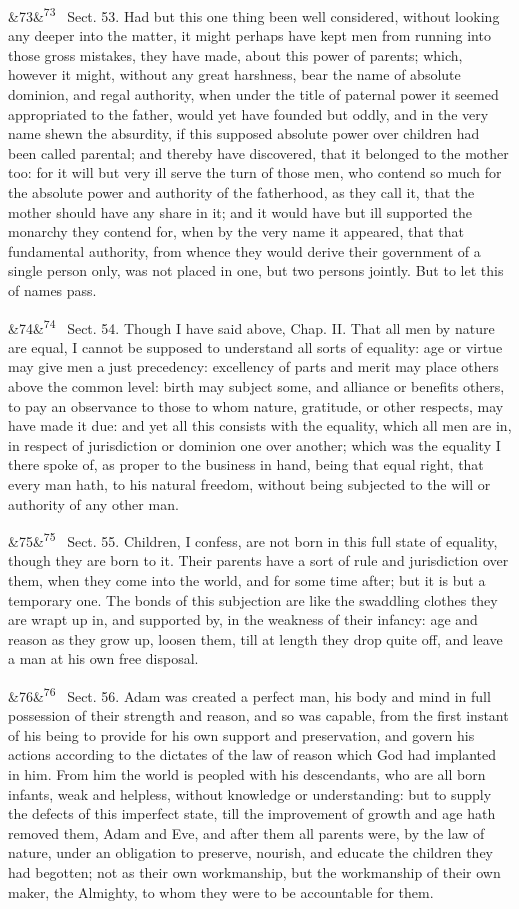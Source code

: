 \documentclass[12pt]{article}
\newcommand{\para}[1][]{\par\noindent\ifx&#1&\else\textsuperscript{\footnotesize #1}~\fi}
\begin{document}
\para[73] Sect. 53. Had but this one thing been well considered, without looking any deeper into the matter, it might perhaps have kept men from running into those gross mistakes, they have made, about this power of parents; which, however it might, without any great harshness, bear the name of absolute dominion, and regal authority, when under the title of paternal power it seemed appropriated to the father, would yet have founded but oddly, and in the very name shewn the absurdity, if this supposed absolute power over children had been called parental; and thereby have discovered, that it belonged to the mother too: for it will but very ill serve the turn of those men, who contend so much for the absolute power and authority of the fatherhood, as they call it, that the mother should have any share in it; and it would have but ill supported the monarchy they contend for, when by the very name it appeared, that that fundamental authority, from whence they would derive their government of a single person only, was not placed in one, but two persons jointly. But to let this of names pass.

\para[74] Sect. 54. Though I have said above, Chap. II. That all men by nature are equal, I cannot be supposed to understand all sorts of equality: age or virtue may give men a just precedency: excellency of parts and merit may place others above the common level: birth may subject some, and alliance or benefits others, to pay an observance to those to whom nature, gratitude, or other respects, may have made it due: and yet all this consists with the equality, which all men are in, in respect of jurisdiction or dominion one over another; which was the equality I there spoke of, as proper to the business in hand, being that equal right, that every man hath, to his natural freedom, without being subjected to the will or authority of any other man.

\para[75] Sect. 55. Children, I confess, are not born in this full state of equality, though they are born to it. Their parents have a sort of rule and jurisdiction over them, when they come into the world, and for some time after; but it is but a temporary one. The bonds of this subjection are like the swaddling clothes they are wrapt up in, and supported by, in the weakness of their infancy: age and reason as they grow up, loosen them, till at length they drop quite off, and leave a man at his own free disposal.

\para[76] Sect. 56. Adam was created a perfect man, his body and mind in full possession of their strength and reason, and so was capable, from the first instant of his being to provide for his own support and preservation, and govern his actions according to the dictates of the law of reason which God had implanted in him. From him the world is peopled with his descendants, who are all born infants, weak and helpless, without knowledge or understanding: but to supply the defects of this imperfect state, till the improvement of growth and age hath removed them, Adam and Eve, and after them all parents were, by the law of nature, under an obligation to preserve, nourish, and educate the children they had begotten; not as their own workmanship, but the workmanship of their own maker, the Almighty, to whom they were to be accountable for them.
\end{document}
